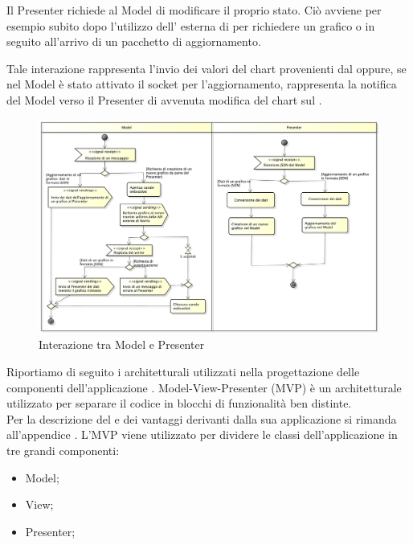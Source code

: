         Il Presenter richiede al Model di modificare il proprio stato. Ciò avviene per esempio subito dopo l'utilizzo dell' esterna di  per richiedere un grafico o in seguito all'arrivo di un pacchetto di aggiornamento.

        Tale interazione rappresenta l'invio dei valori del chart provenienti dal   oppure, se nel Model è stato attivato il socket per l'aggiornamento, rappresenta la notifica del Model verso il Presenter di avvenuta modifica del chart sul .
        
			\begin{figure}[H]\centering
	        		\includegraphics[width=\textwidth]{SpecificaTecnica/Pics/Model-Presenter}
	        		\caption{Interazione tra Model e Presenter}
	    		\end{figure}
        
    Riportiamo di seguito i  architetturali utilizzati nella progettazione delle componenti dell'applicazione .
            Model-View-Presenter (MVP) è un  architetturale utilizzato per separare il codice in blocchi di funzionalità ben distinte.\\
            Per la descrizione del  e dei vantaggi derivanti dalla sua applicazione si rimanda all'appendice .
                L'MVP viene utilizzato per dividere le classi dell'applicazione  in tre grandi componenti:
                \begin{itemize}
                    \item Model;
                    \item View;
                    \item Presenter;
                \end{itemize}

